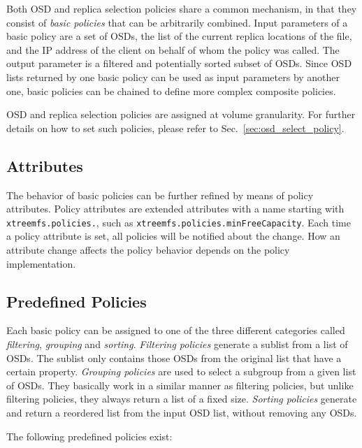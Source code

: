 \documentclass[a4paper,10pt]{book}
\begin{document}
Both OSD and replica selection policies share a common mechanism, in that they consist of \emph{basic policies} that can be arbitrarily combined. Input parameters of a basic policy are a set of OSDs, the list of the current replica locations of the file, and the IP address of the client on behalf of whom the policy was called. The output parameter is a filtered and potentially sorted subset of OSDs. Since OSD lists returned by one basic policy can be used as input parameters by another one, basic policies can be chained to define more complex composite policies.

OSD and replica selection policies are assigned at volume granularity. For further details on how to set such policies, please refer to Sec.\ \ref{sec:osd_select_policy}.

\subsection{Attributes}

The behavior of basic policies can be further refined by means of policy attributes. Policy attributes are extended attributes with a name starting with \texttt{xtreemfs.policies.}, such as \texttt{xtreemfs.policies.minFreeCapacity}. Each time a policy attribute is set, all policies will be notified about the change. How an attribute change affects the policy behavior depends on the policy implementation.

\subsection{Predefined Policies}

Each basic policy can be assigned to one of the three different categories called \emph{filtering}, \emph{grouping} and \emph{sorting}. \emph{Filtering policies} generate a sublist from a list of OSDs. The sublist only contains those OSDs from the original list that have a certain property. \emph{Grouping policies} are used to select a subgroup from a given list of OSDs. They basically work in a similar manner as filtering policies, but unlike filtering policies, they always return a list of a fixed size. \emph{Sorting policies} generate and return a reordered list from the input OSD list, without removing any OSDs.

The following predefined policies exist:
\end{document}

